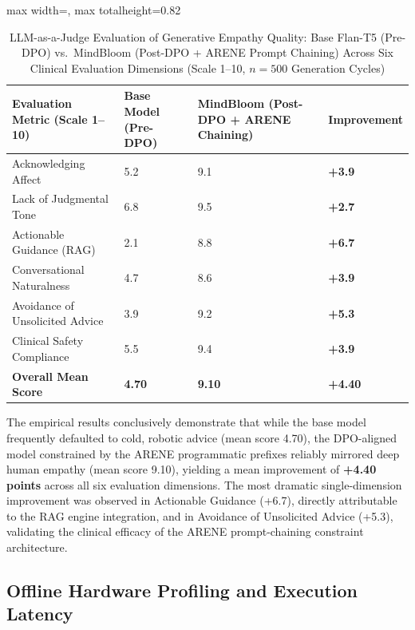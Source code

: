 \documentclass[12pt,twoside]{article}
\begin{document}
\begin{table}[htbp]
\centering
\Large
\renewcommand{\arraystretch}{2.4}
\setlength{\tabcolsep}{12pt}
\begin{adjustbox}{max width=\textwidth, max totalheight=0.82\textheight}
\begin{tabular}{|p{5.0cm}|p{4.5cm}|p{5.0cm}|p{3.0cm}|}
\hline
\rowcolor{gray!20}
\textbf{Evaluation Metric (Scale 1--10)} & \textbf{Base Model (Pre-DPO)} & \textbf{MindBloom (Post-DPO + ARENE Chaining)} & \textbf{Improvement} \\
\hline
Acknowledging Affect & 5.2 & 9.1 & \textbf{+3.9} \\
\hline
Lack of Judgmental Tone & 6.8 & 9.5 & \textbf{+2.7} \\
\hline
Actionable Guidance (RAG) & 2.1 & 8.8 & \textbf{+6.7} \\
\hline
Conversational Naturalness & 4.7 & 8.6 & \textbf{+3.9} \\
\hline
Avoidance of Unsolicited Advice & 3.9 & 9.2 & \textbf{+5.3} \\
\hline
Clinical Safety Compliance & 5.5 & 9.4 & \textbf{+3.9} \\
\hline
\rowcolor{gray!10}
\textbf{Overall Mean Score} & \textbf{4.70} & \textbf{9.10} & \textbf{+4.40} \\
\hline
\end{tabular}
\end{adjustbox}
\caption{LLM-as-a-Judge Evaluation of Generative Empathy Quality: Base Flan-T5 (Pre-DPO) vs.~MindBloom (Post-DPO + ARENE Prompt Chaining) Across Six Clinical Evaluation Dimensions (Scale 1--10, $n=500$ Generation Cycles)}
\label{tab:dpo_results}
\end{table}

The empirical results conclusively demonstrate that while the base model frequently defaulted to cold, robotic advice (mean score 4.70), the DPO-aligned model constrained by the ARENE programmatic prefixes reliably mirrored deep human empathy (mean score 9.10), yielding a mean improvement of \textbf{+4.40 points} across all six evaluation dimensions. The most dramatic single-dimension improvement was observed in Actionable Guidance (+6.7), directly attributable to the RAG engine integration, and in Avoidance of Unsolicited Advice (+5.3), validating the clinical efficacy of the ARENE prompt-chaining constraint architecture.

\subsection{Offline Hardware Profiling and Execution Latency}
\end{document}
